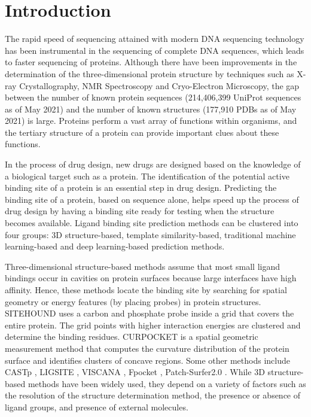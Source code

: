 \documentclass[journal=jacsat,manuscript=article]{achemso}
\begin{document}
\section{Introduction}
\quad The rapid speed of sequencing attained with modern DNA sequencing technology has been instrumental in the sequencing of complete DNA sequences, which leads to faster sequencing of proteins. Although there have been improvements in the determination of the three-dimensional protein structure by techniques such as X-ray Crystallography, NMR Spectroscopy and Cryo-Electron Microscopy, the gap between the number of known protein sequences (214,406,399 UniProt sequences as of May 2021)\cite{uniprot2021uniprot} and the number of known structures (177,910 PDBs as of May 2021)\cite{berman2000protein}\cite{burley2021rcsb} is large. Proteins perform a vast array of functions within organisms, and the tertiary structure of a protein can provide important clues about these functions.

In the process of drug design, new drugs are designed based on the knowledge of a biological target such as a protein. The identification of the potential active binding site of a protein is an essential step in drug design. Predicting the binding site of a protein, based on sequence alone, helps speed up the process of drug design by having a binding site ready for testing when the structure becomes available. Ligand binding site prediction methods can be clustered into four groups: 3D structure-based, template similarity-based, traditional machine learning-based and deep learning-based prediction methods.

Three-dimensional structure-based methods assume that most small ligand bindings occur in cavities on protein surfaces because large interfaces have high affinity. Hence, these methods locate the binding site by searching for spatial geometry or energy features (by placing probes) in protein structures. SITEHOUND \cite{hernandez2009sitehound} uses a carbon and phosphate probe inside a grid that covers the entire protein. The grid points with higher interaction energies are clustered and determine the binding residues. CURPOCKET \cite{liu2020cb} is a spatial geometric measurement method that computes the curvature distribution of the protein surface and identifies clusters of concave regions. Some other methods include CASTp \cite{dundas2006castp}, LIGSITE \cite{hendlich1997ligsite}, VISCANA \cite{amari2006viscana}, Fpocket \cite{le2009fpocket}, Patch-Surfer2.0 \cite{zhu2015large}. While 3D structure-based methods have been widely used, they depend on a variety of factors such as the resolution of the structure determination method, the presence or absence of ligand groups, and presence of external molecules.
\end{document}
